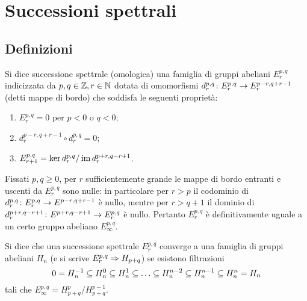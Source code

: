 \chapter{Successioni spettrali}
\section{Definizioni}
\begin{definition}
Si dice successione spettrale (omologica) una famiglia di gruppi abeliani $E^{p,q}_r$ indicizzata da $p,q\in\mathbb{Z},r\in\mathbb{N}$ dotata di omomorfismi $d^{p,q}_r\colon E^{p,q}_r\to E^{p-r,q+r-1}_r$ (detti mappe di bordo) che soddisfa le seguenti proprietà:
\begin{enumerate}
\item $E^{p,q}_r=0$ per $p<0$ o $q<0$;
\item $d^{p-r,q+r-1}_r\circ d^{p,q}_r=0$;
\item $E^{p,q}_{r+1}=\ker d^{p,q}_r/\operatorname{im} d^{p+r,q-r+1}_r$.
\end{enumerate}
\end{definition}
Fissati $p,q\ge 0$, per $r$ sufficientemente grande le mappe di bordo entranti e uscenti da $E^{p,q}_r$ sono nulle: in particolare per $r>p$ il codominio di $d^{p,q}_r\colon E^{p,q}_r\to E^{p-r,q+r-1}$ è nullo, mentre per $r>q+1$ il dominio di $d^{p+r,q-r+1}_r\colon E^{p+r,q-r+1}\to E^{p,q}_r$ è nullo. Pertanto $E^{p,q}_r$ è definitivamente uguale a un certo gruppo abeliano $E^{p,q}_\infty$.
\begin{definition}
Si dice che una successione spettrale $E^{p,q}_r$ converge a una famiglia di gruppi abeliani $H_n$ (e si scrive $E^{p,q}_r\Rightarrow H_{p+q}$) se esistono filtrazioni
$$
0=H^{-1}_n\subseteq H^0_n\subseteq H^1_n\subseteq\ldots\subseteq H^{n-2}_n\subseteq H^{n-1}_n\subseteq H^n_n=H_n
$$
tali che $E^{p,q}_\infty=H^p_{p+q}/H^{p-1}_{p+q}$.
\end{definition}

